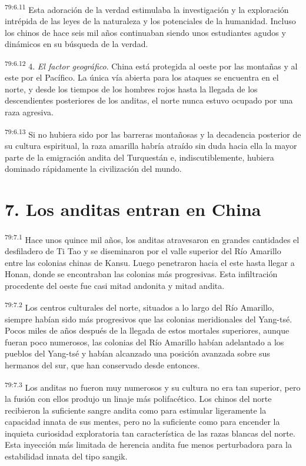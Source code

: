 \par
\textsuperscript{79:6.11} Esta adoración de la verdad estimulaba la investigación y la exploración intrépida de las leyes de la naturaleza y los potenciales de la humanidad. Incluso los chinos de hace seis mil años continuaban siendo unos estudiantes agudos y dinámicos en su búsqueda de la verdad.

\par
\textsuperscript{79:6.12} 4. \textit{El factor geográfico}. China está protegida al oeste por las montañas y al este por el Pacífico. La única vía abierta para los ataques se encuentra en el norte, y desde los tiempos de los hombres rojos hasta la llegada de los descendientes posteriores de los anditas, el norte nunca estuvo ocupado por una raza agresiva.

\par
\textsuperscript{79:6.13} Si no hubiera sido por las barreras montañosas y la decadencia posterior de su cultura espiritual, la raza amarilla habría atraído sin duda hacia ella la mayor parte de la emigración andita del Turquestán e, indiscutiblemente, hubiera dominado rápidamente la civilización del mundo.

\section*{7. Los anditas entran en China}
\par
\textsuperscript{79:7.1} Hace unos quince mil años, los anditas atravesaron en grandes cantidades el desfiladero de Ti Tao y se diseminaron por el valle superior del Río Amarillo entre las colonias chinas de Kansu. Luego penetraron hacia el este hasta llegar a Honan, donde se encontraban las colonias más progresivas. Esta infiltración procedente del oeste fue casi mitad andonita y mitad andita.

\par
\textsuperscript{79:7.2} Los centros culturales del norte, situados a lo largo del Río Amarillo, siempre habían sido más progresivos que las colonias meridionales del Yang-tsé. Pocos miles de años después de la llegada de estos mortales superiores, aunque fueran poco numerosos, las colonias del Río Amarillo habían adelantado a los pueblos del Yang-tsé y habían alcanzado una posición avanzada sobre sus hermanos del sur, que han conservado desde entonces.

\par
\textsuperscript{79:7.3} Los anditas no fueron muy numerosos y su cultura no era tan superior, pero la fusión con ellos produjo un linaje más polifacético. Los chinos del norte recibieron la suficiente sangre andita como para estimular ligeramente la capacidad innata de sus mentes, pero no la suficiente como para encender la inquieta curiosidad exploratoria tan característica de las razas blancas del norte. Esta inyección más limitada de herencia andita fue menos perturbadora para la estabilidad innata del tipo sangik.

